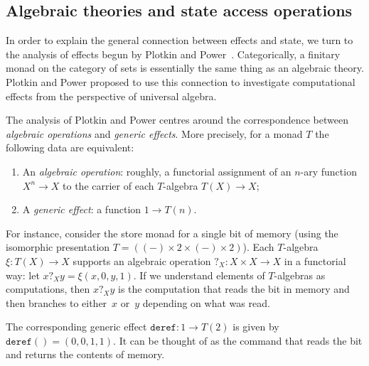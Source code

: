 \documentclass{LMCS}
\begin{document}
\subsection{Algebraic theories and state access operations}
In order to explain the general connection between
effects and state, we turn to the analysis of effects begun by Plotkin and Power~\cite{Plotkin:Power:03}.
Categorically, a finitary monad on the category of sets
is essentially the same thing as an algebraic  theory.
Plotkin and Power proposed to use this
connection 
to investigate computational effects from the perspective of universal algebra.

The analysis of Plotkin and Power centres around the 
correspondence between \emph{algebraic operations} and \emph{generic effects}.
More precisely, for a monad $T$ the following data are equivalent:
\begin{enumerate}
\item An \emph{algebraic operation}:
roughly, a functorial assignment of an $n$-ary function
${X^n\to X}$ to the carrier of each $T$-algebra ${T(X)\to X}$;
\item A \emph{generic effect}: a function $1\to T(n)$. 
\end{enumerate}
For instance, 
consider the store monad for a single bit of memory 
(using the isomorphic presentation 
$T=((-)\times 2\times(-)\times 2)$).
Each $T$-algebra 
$\xi:T(X)\to X$ supports 
an algebraic operation 
$\mathrel{?_X}:X\times X\to X$
in a functorial way: 
let ${x\mathrel{?_X} y=\xi(x,0,y,1)}$. 
If we understand elements of $T$-algebras
as computations, then ${x\mathrel{?_X}y}$ is the computation that  reads
the bit in memory 
and then branches to either~$x$ or~$y$ depending on what was read.

The corresponding generic effect $\mathtt{deref}:1\to T(2)$ 
is given by $\mathtt{deref}() = (0,0,1,1)$.
It can be thought of as the command that 
reads the bit and returns the contents of memory.
\end{document}
